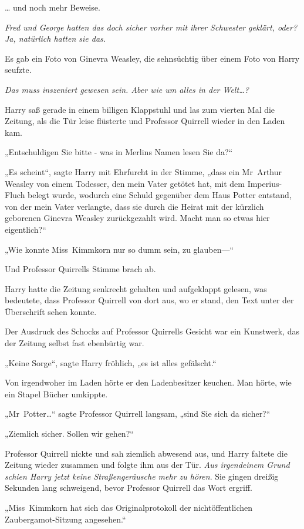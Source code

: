 {… und noch mehr Beweise.

\emph{Fred und George hatten das doch sicher vorher mit ihrer Schwester geklärt, oder? Ja, natürlich hatten sie das.}

Es gab ein Foto von Ginevra Weasley, die sehnsüchtig über einem Foto von Harry seufzte.

\emph{Das muss inszeniert gewesen sein. Aber wie um alles in der Welt…?}

Harry saß gerade in einem billigen Klappstuhl und las zum vierten Mal die Zeitung, als die Tür leise flüsterte und Professor Quirrell wieder in den Laden kam.

„Entschuldigen Sie bitte - was in Merlins Namen lesen Sie da?“

„Es scheint“, sagte Harry mit Ehrfurcht in der Stimme, „dass ein Mr~Arthur Weasley von einem Todesser, den mein Vater getötet hat, mit dem Imperius-Fluch belegt wurde, wodurch eine Schuld gegenüber dem Haus Potter entstand, von der mein Vater verlangte, dass sie durch die Heirat mit der kürzlich geborenen Ginevra Weasley zurückgezahlt wird. Macht man so etwas hier eigentlich?“

„Wie konnte Miss~Kimmkorn nur so dumm sein, zu glauben—“

Und Professor Quirrells Stimme brach ab.

Harry hatte die Zeitung senkrecht gehalten und aufgeklappt gelesen, was bedeutete, dass Professor Quirrell von dort aus, wo er stand, den Text unter der Überschrift sehen konnte.

Der Ausdruck des Schocks auf Professor Quirrells Gesicht war ein Kunstwerk, das der Zeitung selbst fast ebenbürtig war.

„Keine Sorge“, sagte Harry fröhlich, „es ist alles gefälscht.“

Von irgendwoher im Laden hörte er den Ladenbesitzer keuchen. Man hörte, wie ein Stapel Bücher umkippte.

„Mr~Potter…“ sagte Professor Quirrell langsam, „sind Sie sich da sicher?“

„Ziemlich sicher. Sollen wir gehen?“

Professor Quirrell nickte und sah ziemlich abwesend aus, und Harry faltete die Zeitung wieder zusammen und folgte ihm aus der Tür. \emph{Aus irgendeinem Grund schien Harry jetzt keine Straßengeräusche mehr zu hören}. Sie gingen dreißig Sekunden lang schweigend, bevor Professor Quirrell das Wort ergriff.

„Miss~Kimmkorn hat sich das Originalprotokoll der nichtöffentlichen Zaubergamot-Sitzung angesehen.“

}
